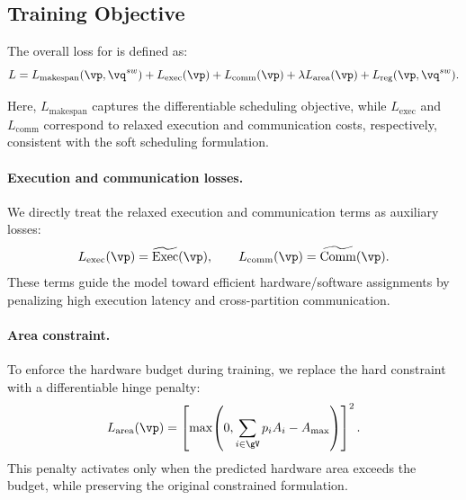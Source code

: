 \subsection{Training Objective}

The overall loss for \diffgnn is defined as:
\begin{equation}
L
=
L_{\mathrm{makespan}}(\vp,\vq^{sw})
+
L_{\mathrm{exec}}(\vp)
+
L_{\mathrm{comm}}(\vp)
+
\lambda L_{\mathrm{area}}(\vp)
+
L_{\mathrm{reg}}(\vp,\vq^{sw}).
\end{equation}

Here, $L_{\mathrm{makespan}}$ captures the differentiable scheduling objective, while $L_{\mathrm{exec}}$ and $L_{\mathrm{comm}}$ correspond to relaxed execution and communication costs, respectively, consistent with the soft scheduling formulation.

\paragraph{\textbf{Execution and communication losses.}}
We directly treat the relaxed execution and communication terms as auxiliary losses:
\begin{equation}
L_{\mathrm{exec}}(\vp) = \widetilde{\mathrm{Exec}}(\vp),
\qquad
L_{\mathrm{comm}}(\vp) = \widetilde{\mathrm{Comm}}(\vp).
\end{equation}
These terms guide the model toward efficient hardware/software assignments by penalizing high execution latency and cross-partition communication.

\paragraph{\textbf{Area constraint.}}
To enforce the hardware budget during training, we replace the hard constraint with a differentiable hinge penalty:
\begin{equation}
L_{\mathrm{area}}(\vp)
=
\left[
\max\!\left(
0,\sum_{i\in\gV} p_i A_i - A_{\max}
\right)
\right]^2.
\end{equation}
This penalty activates only when the predicted hardware area exceeds the budget, while preserving the original constrained formulation.


